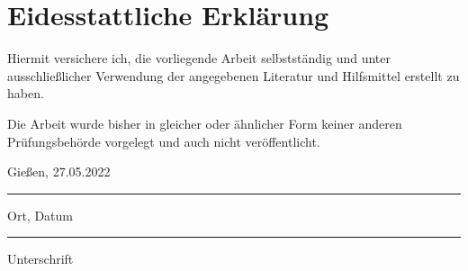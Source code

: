 \section*{Eidesstattliche Erklärung}
	\vspace{1cm}
	Hiermit versichere ich, die vorliegende Arbeit selbstständig und unter ausschließlicher Verwendung der angegebenen Literatur und Hilfsmittel erstellt zu haben.
	
	Die Arbeit wurde bisher in gleicher oder ähnlicher Form keiner anderen Prüfungsbehörde vorgelegt und auch nicht veröffentlicht.
	
	\vspace{2cm}
	\parbox{6cm}{\centering Gießen, 27.05.2022\hrule
		\strut \centering\footnotesize Ort, Datum} \hfill\parbox{6cm}{\hrule
		\strut \centering\footnotesize Unterschrift}
